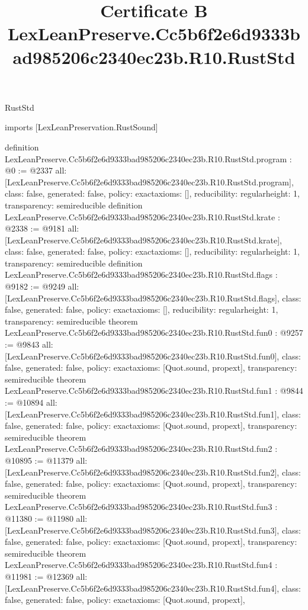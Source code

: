 \begin{lexlean}{RustStd}
\title{Certificate B LexLeanPreserve.Cc5b6f2e6d9333bad985206c2340ec23b.R10.RustStd}
\begin{coremodule}
imports [LexLeanPreservation.RustSound]

definition LexLeanPreserve.Cc5b6f2e6d9333bad985206c2340ec23b.R10.RustStd.program : @0 := @2337 {
  all: [LexLeanPreserve.Cc5b6f2e6d9333bad985206c2340ec23b.R10.RustStd.program],
  class: false,
  generated: false,
  policy: exact{axioms: []},
  reducibility: regular{height: 1},
  transparency: semireducible
}
definition LexLeanPreserve.Cc5b6f2e6d9333bad985206c2340ec23b.R10.RustStd.krate : @2338 := @9181 {
  all: [LexLeanPreserve.Cc5b6f2e6d9333bad985206c2340ec23b.R10.RustStd.krate],
  class: false,
  generated: false,
  policy: exact{axioms: []},
  reducibility: regular{height: 1},
  transparency: semireducible
}
definition LexLeanPreserve.Cc5b6f2e6d9333bad985206c2340ec23b.R10.RustStd.flags : @9182 := @9249 {
  all: [LexLeanPreserve.Cc5b6f2e6d9333bad985206c2340ec23b.R10.RustStd.flags],
  class: false,
  generated: false,
  policy: exact{axioms: []},
  reducibility: regular{height: 1},
  transparency: semireducible
}
theorem LexLeanPreserve.Cc5b6f2e6d9333bad985206c2340ec23b.R10.RustStd.fun0 : @9257 := @9843 {
  all: [LexLeanPreserve.Cc5b6f2e6d9333bad985206c2340ec23b.R10.RustStd.fun0],
  class: false,
  generated: false,
  policy: exact{axioms: [Quot.sound, propext]},
  transparency: semireducible
}
theorem LexLeanPreserve.Cc5b6f2e6d9333bad985206c2340ec23b.R10.RustStd.fun1 : @9844 := @10894 {
  all: [LexLeanPreserve.Cc5b6f2e6d9333bad985206c2340ec23b.R10.RustStd.fun1],
  class: false,
  generated: false,
  policy: exact{axioms: [Quot.sound, propext]},
  transparency: semireducible
}
theorem LexLeanPreserve.Cc5b6f2e6d9333bad985206c2340ec23b.R10.RustStd.fun2 : @10895 := @11379 {
  all: [LexLeanPreserve.Cc5b6f2e6d9333bad985206c2340ec23b.R10.RustStd.fun2],
  class: false,
  generated: false,
  policy: exact{axioms: [Quot.sound, propext]},
  transparency: semireducible
}
theorem LexLeanPreserve.Cc5b6f2e6d9333bad985206c2340ec23b.R10.RustStd.fun3 : @11380 := @11980 {
  all: [LexLeanPreserve.Cc5b6f2e6d9333bad985206c2340ec23b.R10.RustStd.fun3],
  class: false,
  generated: false,
  policy: exact{axioms: [Quot.sound, propext]},
  transparency: semireducible
}
theorem LexLeanPreserve.Cc5b6f2e6d9333bad985206c2340ec23b.R10.RustStd.fun4 : @11981 := @12369 {
  all: [LexLeanPreserve.Cc5b6f2e6d9333bad985206c2340ec23b.R10.RustStd.fun4],
  class: false,
  generated: false,
  policy: exact{axioms: [Quot.sound, propext]},
}
\end{coremodule}
\end{lexlean}
